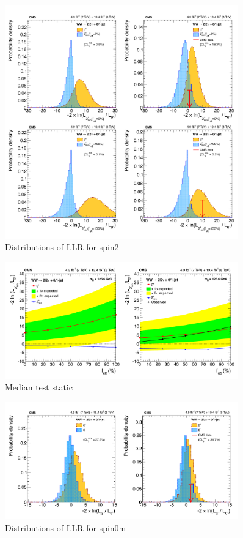 %
\begin{figure}[ht!] 
\centering 
\includegraphics[width=0.9\textwidth]{figures/spin2LLR.pdf}
\caption{Distributions of LLR for spin2}  
\label{fig:llr_spin2} 
\end{figure} 
%
\begin{figure}[ht!] 
\centering 
\includegraphics[width=0.9\textwidth]{figures/spinLLRband.pdf}
\caption{Median test static} 
\label{fig:llr_band} 
\end{figure} 
%
\begin{figure}[ht!] 
\centering 
\includegraphics[width=0.9\textwidth]{figures/spin0mLLR.pdf}
\caption{Distributions of LLR for spin0m}  
\label{fig:llr_spin0m} 
\end{figure} 

